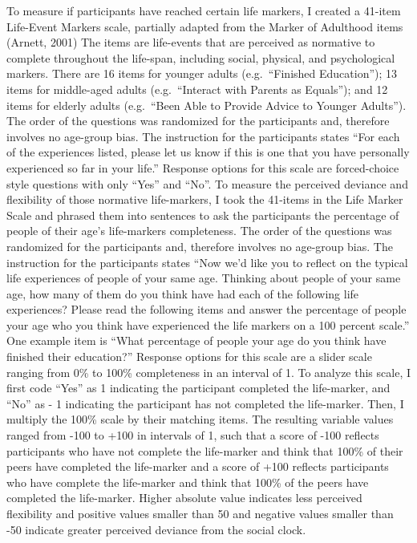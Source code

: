 \documentclass[
  man,floatsintext]{apa6}
\begin{document}
To measure if participants have reached certain life markers, I created a 41-item Life-Event Markers scale, partially adapted from the Marker of Adulthood items (Arnett, 2001) The items are life-events that are perceived as normative to complete throughout the life-span, including social, physical, and psychological markers. There are 16 items for younger adults (e.g.~``Finished Education''); 13 items for middle-aged adults (e.g.~``Interact with Parents as Equals''); and 12 items for elderly adults (e.g.~``Been Able to Provide Advice to Younger Adults''). The order of the questions was randomized for the participants and, therefore involves no age-group bias. The instruction for the participants states ``For each of the experiences listed, please let us know if this is one that you have personally experienced so far in your life.'' Response options for this scale are forced-choice style questions with only ``Yes'' and ``No''.
To measure the perceived deviance and flexibility of those normative life-markers, I took the 41-items in the Life Marker Scale and phrased them into sentences to ask the participants the percentage of people of their age's life-markers completeness. The order of the questions was randomized for the participants and, therefore involves no age-group bias. The instruction for the participants states ``Now we'd like you to reflect on the typical life experiences of people of your same age. Thinking about people of your same age, how many of them do you think have had each of the following life experiences? Please read the following items and answer the percentage of people your age who you think have experienced the life markers on a 100 percent scale.'' One example item is ``What percentage of people your age do you think have finished their education?'' Response options for this scale are a slider scale ranging from 0\% to 100\% completeness in an interval of 1.
To analyze this scale, I first code ``Yes'' as 1 indicating the participant completed the life-marker, and ``No'' as - 1 indicating the participant has not completed the life-marker. Then, I multiply the 100\% scale by their matching items. The resulting variable values ranged from -100 to +100 in intervals of 1, such that a score of -100 reflects participants who have not complete the life-marker and think that 100\% of their peers have completed the life-marker and a score of +100 reflects participants who have complete the life-marker and think that 100\% of the peers have completed the life-marker. Higher absolute value indicates less perceived flexibility and positive values smaller than 50 and negative values smaller than -50 indicate greater perceived deviance from the social clock.
\end{document}
